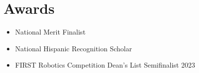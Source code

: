 \documentclass[10pt, letterpaper]{article}
\newenvironment{highlights}{
    \begin{itemize}[
        topsep=0.10 cm,
        parsep=0.10 cm,
        partopsep=0pt,
        itemsep=0pt,
        leftmargin=0.4 cm + 10pt
    ]
}{
    \end{itemize}
} %
\begin{document}
        \vspace{0.2 cm}    

    \section{Awards}
        \begin{highlights}
            \item National Merit Finalist
            \item National Hispanic Recognition Scholar
            \item FIRST Robotics Competition Dean’s List Semifinalist 2023 
        \end{highlights}
\end{document}

